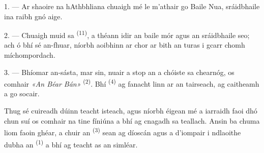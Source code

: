 %
%


\VUsaut{4.0mm}
\VUsaut{3.0mm}
\VUfilet{16mm}
\VUsaut{5.6mm}
\VUsaut{3.0mm}

\VUsaut{3.0mm}

\VUsaut{4.0mm}

1. --- Ar shaoire na hAthbhliana chuaigh mé le m'athair go Baile Nua, sráidbhaile
ina raibh gnó aige.

2. --- Chuaigh muid sa  \textsuperscript{(11)}, a théann idir an
baile mór agus an sráidbhaile seo; ach ó bhí sé an-fhuar, níorbh aoibhinn ar chor
ar bith an turas i gcarr chomh míchompordach.

3. --- Bhíomar an-sásta, mar sin, nuair a stop an  a chóiste sa
chearnóg, os comhair  \textit{«An Béar Bán»}
\textsuperscript{(2)}. Bhí  \textsuperscript{(4)} ag
fanacht linn ar an tairseach, ag caitheamh a  go socair.

Thug sé cuireadh dúinn teacht isteach, agus níorbh éigean mé a iarraidh faoi dhó
chun suí os comhair na tine fíniúna a bhí ag cnagadh sa teallach. Ansin ba chuma
liom faoin  ghéar, a chuir an 
\textsuperscript{(3)} sean ag díoscán agus a d'iompair i ndlaoithe dubha an
 \textsuperscript{(1)} a bhí ag teacht as an simléar.

